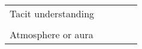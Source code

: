\begin{table}[]
\begin{tabular}{@{}lllll@{}}
  Tacit understanding                                                       &                    &                                                                                                                                                &                                                                                                                                                                                                                                                                                                                                                                                                      &                                                                                                                                                                                                                                                                                               \\
                                                                            &                    &                                                                                                                                                &                                                                                                                                                                                                                                                                                                                                                                                                      &                                                                                                                                                                                                                                                                                               \\
  Atmosphere or aura                                                        &                    &                                                                                                                                                &                                                                                                                                                                                                                                                                                                                                                                                                      &                                                                                                                                                                                                                                                                                               \\

\end{tabular}
\end{table}
